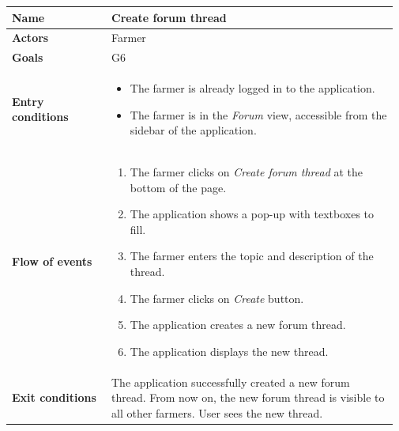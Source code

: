 \begin{table}[H]
    \centering
	\begin{tabular}{@{}p{0.25\linewidth} p{0.72\linewidth}@{}}
\toprule
		\textbf{Name}               & Create forum thread\\
		\midrule
		\textbf{Actors}             & Farmer\\
		\midrule
		\textbf{Goals}              & G6 \\
		\midrule
		
		\textbf{Entry conditions}   & \begin{itemize}[leftmargin=.4cm,noitemsep,topsep=0pt,before=\vspace{-3mm},after=\vspace{-4mm}]
		    \item The farmer is already logged in to the application.
		    \item The farmer is in the \textit{Forum} view, accessible from the sidebar of the application.
		\end{itemize}\\
		\midrule
		
		\textbf{Flow of events}     & \begin{enumerate}[leftmargin=.4cm,noitemsep,topsep=0pt,before=\vspace{-3mm},after=\vspace{-4mm}]
		    \item The farmer clicks on \textit{Create forum thread} at the bottom of the page.
		    \item The application shows a pop-up with textboxes to fill.
		    \item The farmer enters the topic and description of the thread.
		    \item The farmer clicks on \textit{Create} button.
		    \item The application creates a new forum thread.
		    \item The application displays the new thread.
		\end{enumerate}\\
		\midrule
		\textbf{Exit conditions}    & The application successfully created a new forum thread. From now on, the new forum thread is visible to all other farmers. User sees the new thread. \\
		\midrule
		

\end{tabular}
\end{table}
